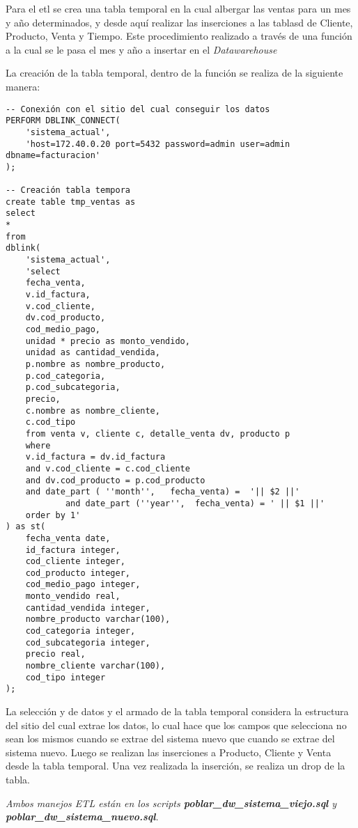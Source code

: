 Para el etl se crea una tabla temporal en la cual albergar las ventas para un mes y año determinados, y desde aquí realizar las inserciones a las tablasd de Cliente, Producto, Venta y Tiempo. Este procedimiento realizado a través de una función a la cual se le pasa el mes y año a insertar en el \emph{Datawarehouse}

La creación de la tabla temporal, dentro de la función se realiza de la siguiente manera:

\begin{lstlisting}[title=Creación de la Tabla Temporal]
-- Conexión con el sitio del cual conseguir los datos
PERFORM DBLINK_CONNECT(
    'sistema_actual',
    'host=172.40.0.20 port=5432 password=admin user=admin dbname=facturacion'
);

-- Creación tabla tempora
create table tmp_ventas as
select
* 
from 
dblink(
    'sistema_actual', 
    'select
    fecha_venta,
    v.id_factura,
    v.cod_cliente,
    dv.cod_producto,
    cod_medio_pago,
    unidad * precio as monto_vendido,
    unidad as cantidad_vendida,
    p.nombre as nombre_producto,
    p.cod_categoria,
    p.cod_subcategoria,
    precio,
    c.nombre as nombre_cliente,
    c.cod_tipo
    from venta v, cliente c, detalle_venta dv, producto p
    where 
    v.id_factura = dv.id_factura
    and v.cod_cliente = c.cod_cliente
    and dv.cod_producto = p.cod_producto 
    and date_part ( ''month'',   fecha_venta) =  '|| $2 ||'
            and date_part (''year'',  fecha_venta) = ' || $1 ||'
    order by 1'
) as st(
    fecha_venta date,
    id_factura integer,
    cod_cliente integer,
    cod_producto integer,
    cod_medio_pago integer,
    monto_vendido real,
    cantidad_vendida integer,
    nombre_producto varchar(100),
    cod_categoria integer,
    cod_subcategoria integer,
    precio real,
    nombre_cliente varchar(100),
    cod_tipo integer
);
\end{lstlisting}

La selección y de datos y el armado de la tabla temporal considera la estructura del sitio del cual extrae los datos, lo cual hace que los campos que selecciona no sean los mismos cuando se extrae del sistema nuevo que cuando se extrae del sistema nuevo. Luego se realizan las inserciones a Producto, Cliente y Venta desde la tabla temporal. Una vez realizada la inserción, se realiza un drop de la tabla.


\emph{Ambos manejos ETL están en los \emph{scripts} \textbf{poblar\_dw\_sistema\_viejo.sql} y \textbf{poblar\_dw\_sistema\_nuevo.sql}.}

